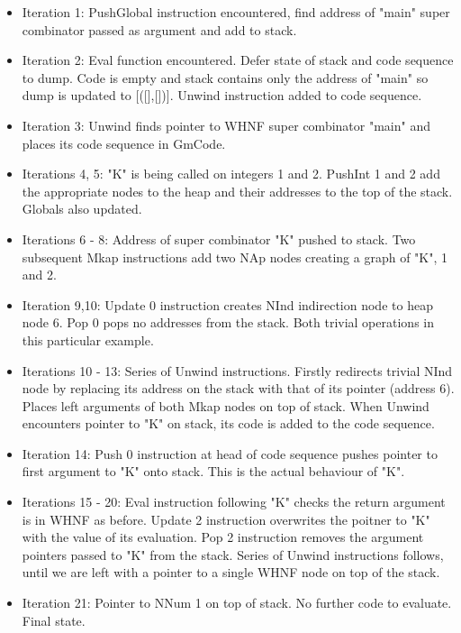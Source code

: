 \begin{itemize}
	\item Iteration 1: PushGlobal instruction encountered, find
		  address of "main" super combinator passed as argument
		  and add to stack. 
	\item Iteration 2: Eval function encountered. Defer state of
		  stack and code sequence to dump. Code is empty and stack
		  contains only the address of "main" so dump is updated
		  to [([],[])]. Unwind instruction added to code sequence.
	\item Iteration 3: Unwind finds pointer to WHNF super combinator
		  "main" and places its code sequence in GmCode.
	\item Iterations 4, 5: "K" is being called on integers 1 and 2.
		  PushInt 1 and 2 add the appropriate nodes to the heap and
		  their addresses to the top of the stack. Globals also
		  updated.
	\item Iterations 6 - 8: Address of super combinator "K" pushed
		  to stack. Two subsequent Mkap instructions add two NAp
		  nodes creating a graph of "K", 1 and 2. 
	\item Iteration 9,10: Update 0 instruction creates NInd
		  indirection node to heap node 6. Pop 0 pops no addresses
		  from the stack. Both trivial operations in this particular
		  example.
	\item Iterations 10 - 13: Series of Unwind instructions. Firstly
		  redirects trivial NInd node by replacing its address on the
		  stack with that of its pointer (address 6). Places left
		  arguments of both Mkap nodes on top of stack. When Unwind
		  encounters pointer to "K" on stack, its code is added to
		  the code sequence.
	\item Iteration 14: Push 0 instruction at head of code sequence
		  pushes pointer to first argument to "K" onto stack. This
		  is the actual behaviour of "K".
	\item Iterations 15 - 20: Eval instruction following "K" checks
		  the return argument is in WHNF as before. Update 2 instruction
		  overwrites the poitner to "K" with the value of its evaluation.
		  Pop 2 instruction removes the argument pointers passed to
		  "K" from the stack. Series of Unwind instructions follows,
		  until we are left with a pointer to a single WHNF node on
		  top of the stack.
	\item Iteration 21: Pointer to NNum 1 on top of stack. No further
		  code to evaluate. Final state.
\end{itemize}

